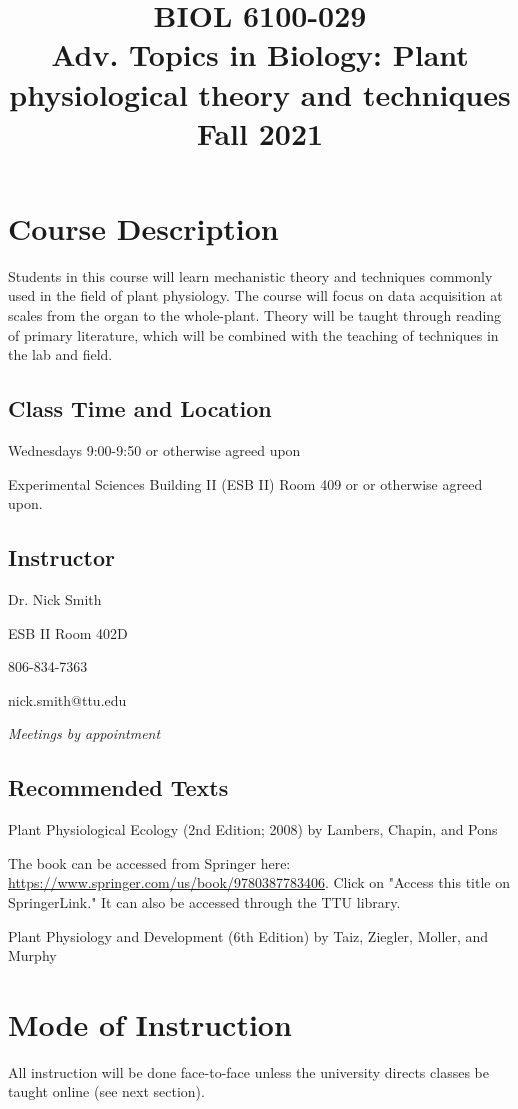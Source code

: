 \documentclass[12pt, notitlepage]{article}   	%
\title{
	\textbf{
		BIOL 6100-029
	} \\
	\large Adv. Topics in Biology: Plant physiological theory and techniques \\
	\large Fall 2021
}
\date{\vspace{-5ex}}
\begin{document}
{\selectfont %

\maketitle

\section{Course Description}
Students in this course will learn mechanistic theory and techniques commonly used in
the field of plant physiology. The course will focus on data acquisition at scales from
the organ to the whole-plant. Theory will be taught through reading of primary literature,
which will be combined with the teaching of techniques in the lab and field.

\subsection{Class Time and Location}
Wednesdays 9:00-9:50 or otherwise agreed upon

Experimental Sciences Building II (ESB II) Room 409 or 
or otherwise agreed upon.

\subsection{Instructor}
Dr. Nick Smith \par
ESB II Room 402D \par
806-834-7363 \par
nick.smith@ttu.edu \par
\textit{Meetings by appointment}

\subsection{Recommended Texts}
Plant Physiological Ecology (2nd Edition; 2008) by Lambers, Chapin, and Pons \par
The book can be accessed from Springer here: 
\url{https://www.springer.com/us/book/9780387783406}. Click on "Access this title on 
SpringerLink." It can also be accessed through the TTU library. \par
Plant Physiology and Development (6th Edition) by Taiz, Ziegler, Moller, and Murphy

\section{Mode of Instruction}
All instruction will be done face-to-face unless the university directs classes be taught online (see next section).

}
\end{document}
